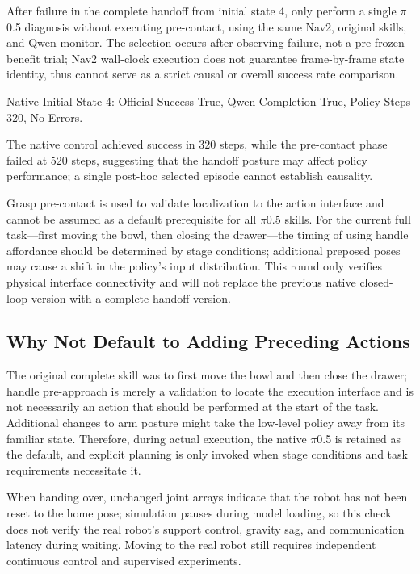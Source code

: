 After failure in the complete handoff from initial state 4, only perform a single \(\pi\)0.5 diagnosis without executing pre-contact, using the same Nav2, original skills, and Qwen monitor. The selection occurs after observing failure, not a pre-frozen benefit trial; Nav2 wall-clock execution does not guarantee frame-by-frame state identity, thus cannot serve as a strict causal or overall success rate comparison.

Native Initial State 4: Official Success True, Qwen Completion True, Policy Steps 320, No Errors.

The native control achieved success in 320 steps, while the pre-contact phase failed at 520 steps, suggesting that the handoff posture may affect policy performance; a single post-hoc selected episode cannot establish causality.

Grasp pre-contact is used to validate localization to the action interface and cannot be assumed as a default prerequisite for all \(\pi\)0.5 skills. For the current full task—first moving the bowl, then closing the drawer—the timing of using handle affordance should be determined by stage conditions; additional preposed poses may cause a shift in the policy's input distribution. This round only verifies physical interface connectivity and will not replace the previous native closed-loop version with a complete handoff version.


\subsection{Why Not Default to Adding Preceding Actions}\label{s20-detail-3}

The original complete skill was to first move the bowl and then close the drawer; handle pre-approach is merely a validation to locate the execution interface and is not necessarily an action that should be performed at the start of the task. Additional changes to arm posture might take the low-level policy away from its familiar state. Therefore, during actual execution, the native \(\pi\)0.5 is retained as the default, and explicit planning is only invoked when stage conditions and task requirements necessitate it.

When handing over, unchanged joint arrays indicate that the robot has not been reset to the home pose; simulation pauses during model loading, so this check does not verify the real robot's support control, gravity sag, and communication latency during waiting. Moving to the real robot still requires independent continuous control and supervised experiments.

